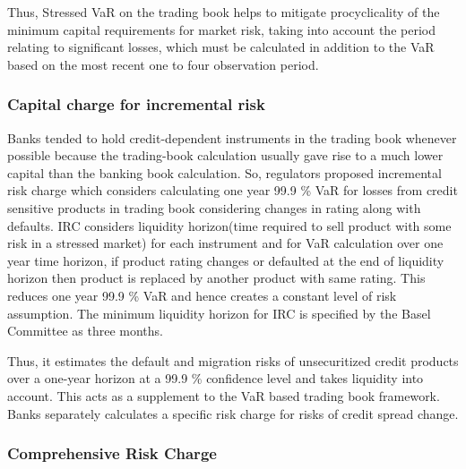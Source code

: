 \documentclass[11pt]{article}
\numberwithin{equation}{section}
\begin{document}
\hspace{1cm}Thus, Stressed VaR on the trading book helps to mitigate procyclicality of the minimum capital requirements for market risk, taking into account the period relating to significant losses, which must be calculated in addition to the VaR based on the most recent one to four observation period. 
	

\subsubsection{ Capital charge for incremental risk}
Banks tended to hold credit-dependent instruments in the trading book whenever possible because the trading-book calculation usually gave rise to a much lower capital than the banking book calculation. So, regulators proposed incremental risk charge which considers calculating one year 99.9 \% VaR for losses from credit sensitive products in trading book considering changes in rating along with defaults. IRC considers liquidity horizon(time required to sell product with some risk in a stressed market) for each instrument and for VaR calculation over one year time horizon, if product rating changes or defaulted at the end of liquidity horizon then product is replaced by another product with same rating. This reduces one year 99.9 \% VaR and hence creates a constant level of risk assumption. The minimum liquidity horizon for IRC is specified by the Basel Committee as three months.

\hspace{1cm} Thus, it estimates the default and migration risks of unsecuritized credit products over a one-year horizon at a 99.9 \% confidence level and takes liquidity into account. This acts as a supplement to the VaR based trading book framework. Banks separately calculates a specific risk charge for risks of credit spread change.

\subsubsection{Comprehensive Risk Charge}
\medskip
\end{document}
